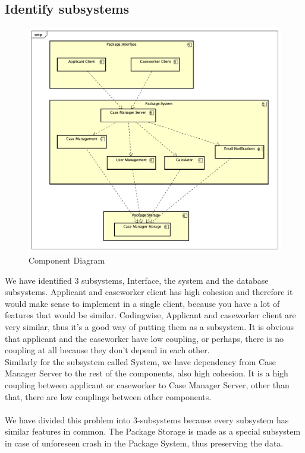 \newpage
\subsection{Identify subsystems}
\begin{figure}[htb!]
    \centering
    \includegraphics[width=\textwidth]{img/cmp-diagram.png}
    \caption{Component Diagram}
\end{figure}
We have identified 3 subsystems, Interface, the system and the database subsystems.
Applicant and caseworker client has high cohesion and therefore it would make sense to implement in a single client, because you have a lot of features that would be similar. Codingwise, Applicant and caseworker client are very similar, thus it's a good way of putting them as a subsystem. It is obvious that applicant and the caseworker have low coupling, or perhaps, there is no coupling at all because they don't depend in each other. \\
Similarly for the subsystem called System, we have dependency from Case Manager Server to the rest of the components, also high cohesion. 
It is a high coupling between applicant or caseworker to Case Manager Server, other than that, there are  low couplings between other components.\\
\\
We have divided this problem into 3-subsystems because  every subsystem has similar features in common. The Package Storage is made as a special subsystem in case of  unforeseen crash in the Package System, thus preserving the data.





  